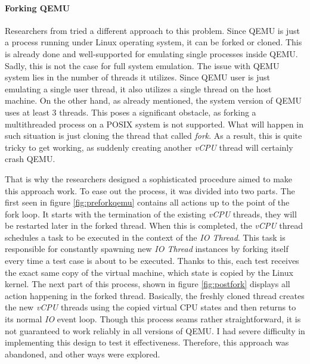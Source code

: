 \paragraph{Forking QEMU}
Researchers from \cite{triforceafl} tried a different approach to this problem. Since QEMU is just a process running under Linux operating system, it can be forked or cloned. This is already done and well-supported for emulating single processes inside QEMU. Sadly, this is not the case for full system emulation. The issue with QEMU system lies in the number of threads it utilizes. Since QEMU user is just emulating a single user thread, it also utilizes a single thread on the host machine. On the other hand, as already mentioned, the system version of QEMU uses at least 3 threads. This poses a significant obstacle, as forking a multithreaded process on a POSIX system is not supported. What will happen in such situation is just cloning the thread that called \textit{fork}. As a result, this is quite tricky to get working, as suddenly creating another \textit{vCPU} thread will certainly crash QEMU.

That is why the researchers designed a sophisticated procedure aimed to make this approach work. To ease out the process, it was divided into two parts. The first seen in figure \ref{fig:preforkqemu} contains all actions up to the point of the fork loop. It starts with the termination of the existing \textit{vCPU} threads, they will be restarted later in the forked thread. When this is completed, the \textit{vCPU} thread schedules a task to be executed in the context of the \textit{IO Thread}. This task is responsible for constantly spawning new \textit{IO Thread} instances by forking itself every time a test case is about to be executed. Thanks to this, each test receives the exact same copy of the virtual machine, which state is copied by the Linux kernel. The next part of this process, shown in figure \ref{fig:postfork} displays all action happening in the forked thread. Basically, the freshly cloned thread creates the new \textit{vCPU} threads using the copied virtual CPU states and then returns to its normal \textit{IO} event loop. Though this process seams rather straightforward, it is not guaranteed to work reliably in all versions of QEMU. I had severe difficulty in implementing this design to test it effectiveness. Therefore, this approach was abandoned, and other ways were explored.

